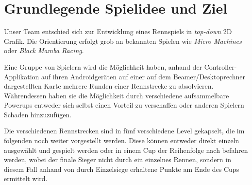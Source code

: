 \section{Grundlegende Spielidee und Ziel}

Unser Team entschied sich zur Entwicklung eines Rennspiels in \textit{top-down} 2D Grafik.
Die Orientierung erfolgt grob an bekannten Spielen wie \textit{Micro Machines} oder \textit{Black Mamba Racing}.

Eine Gruppe von Spielern wird die Möglichkeit haben, anhand der Controller-Applikation auf ihren Androidgeräten auf einer auf dem Beamer/Desktoprechner dargestellten Karte mehrere Runden einer Rennstrecke zu absolvieren.
Währendessen haben sie die Möglichkeit durch verschiedene aufsammelbare Powerups entweder sich selbst einen Vorteil zu verschaffen oder anderen Spielern Schaden hinzuzufügen.

Die verschiedenen Rennstrecken sind in fünf verschiedene Level gekapselt, die im folgenden noch weiter vorgestellt werden.
Diese können entweder direkt einzeln ausgewählt und gespielt werden oder in einem Cup der Reihenfolge nach befahren werden, wobei der finale Sieger nicht durch ein einzelnes Rennen, sondern in diesem Fall anhand von durch Einzelsiege erhaltene Punkte am Ende des Cups ermittelt wird.
